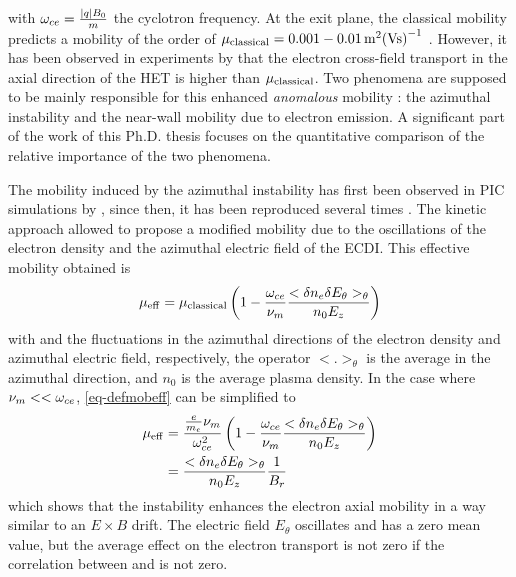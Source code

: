   with $\omega_{ce}= \frac{\lvert q\rvert B_0}{m}$ the cyclotron frequency.
  At the exit plane, the classical mobility predicts a mobility of the order of $\mu_{\mathrm{classical}}=0.001-0.01\, \text{m}^2\text{(Vs)}^{-1}$ \citep{adam2008a}.
  However, it has been observed in experiments by \citet{meezan2001} that the electron cross-field transport in the axial direction of the \ac{HET} is higher than $\mu_{\mathrm{classical}}$.
  Two phenomena are supposed to be mainly responsible for this enhanced \emph{anomalous} mobility \citep{croes2017}\string: the azimuthal instability and the near-wall mobility due to electron emission.
  A significant part of the work of this Ph.D. thesis focuses on the quantitative comparison of the relative importance of the two phenomena.
  
  The mobility induced by the azimuthal instability has first been observed in \ac{PIC} simulations by \citet{adam2004}, since then, it has been reproduced several times \citep{adam2008a,heron2013,lafleur2016a,croes2017,boeuf2018,taccogna2019}.
  The kinetic approach allowed \citet{lafleur2016a} to propose a modified mobility due to the oscillations of the electron density and the azimuthal electric field of the \ac{ECDI}.
  This effective mobility obtained is 
  \begin{equation} \label{eq-defmobeff}
    \mu_{\mathrm{eff}} = \mu_{\mathrm{classical}} \left( 1 - \frac{\omega_{ce}}{\nu_m}  \frac{< \delta n_e \delta E_{\theta} >_{\theta} }{n_0 E_z}   \right)
  \end{equation}
  with \dne{} and \dEt{} the fluctuations in the azimuthal directions of the electron density and azimuthal electric field, respectively, the operator $< . >_{\theta}$ is the average in the azimuthal direction, and $n_0$ is the average plasma density.
  In the case where $\nu_m << \omega_{ce}$, \cref{eq-defmobeff} can be simplified to 
  \begin{align} 
    \mu_{\mathrm{eff}} &= \frac{\frac{e}{m_e} \nu_m}{\omega_{ce}^2} \left( 1 - \frac{\omega_{ce}}{\nu_m}  \frac{< \delta n_e \delta E_{\theta} >_{\theta} }{n_0 E_z}   \right) \nonumber \\
    &= \frac{< \delta n_e \delta E_{\theta} >_{\theta} }{n_0 E_z}   \frac{1}{B_r} \label{eq-mobeffsimple}
  \end{align}
  which shows that the instability enhances the electron axial mobility in a way similar to an $E \times B$ drift.
  The electric field $E_{\theta}$ oscillates and has a zero mean value, but the average effect on the electron transport is not zero if the correlation between \dEt{} and \dne{} is not zero.
  
